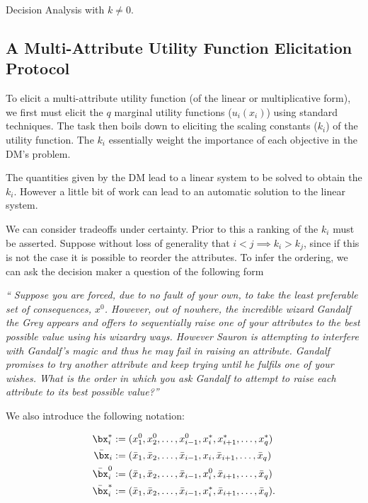 \begin{chapter}{Decision Analysis \label{Ch:decision}}
with $k \neq 0$.

\subsection{A Multi-Attribute Utility Function Elicitation Protocol}

To elicit a multi-attribute utility function (of the linear or multiplicative form), we first must elicit the $q$ marginal utility functions ($u_i(x_i)$) using standard techniques. The task then boils down to eliciting the scaling constants ($k_i$) of the utility function. The $k_i$ essentially weight the importance of each objective in the DM's problem.

The quantities given by the DM lead to a linear system to be solved to obtain the $k_i$. However a little bit of work can lead to an automatic solution to the linear system.

We can consider tradeoffs under certainty. Prior to this a ranking of the $k_i$ must be asserted. Suppose without loss of generality that $i<j \implies k_i > k_j$, since if this is not the case it is possible to reorder the attributes. To infer the ordering, we can ask the decision maker a question of the following form

\textit{``
Suppose you are forced, due to no fault of your own, to take the least preferable set of consequences, $x^0$. However, out of nowhere, the incredible wizard Gandalf the Grey appears and offers to sequentially raise one of your attributes to the best possible value using his wizardry ways. However Sauron is attempting to interfere with Gandalf's magic and thus he may fail in raising an attribute. Gandalf promises to try another attribute and keep trying until he fulfils one of your wishes. What is the order in which you ask Gandalf to attempt to raise each attribute to its best possible value?''
}

We also introduce the following notation:

\begin{align}
\bx_i ^* & := (x_1 ^0 , x_2 ^0, \ldots, x_{i-1} ^0, x_i ^*, x_{i+1} ^*, \ldots, x_q ^*) \\
\bar{\bx}_i & := (\bar{x}_1, \bar{x}_2,\ldots,\bar{x}_{i-1}, x_i,\bar{x}_{i+1}, \ldots,\bar{x}_{q}) \\
\bar{\bx}^0 _i & := (\bar{x}_1, \bar{x}_2,\ldots,\bar{x}_{i-1}, x^0 _i,\bar{x}_{i+1}, \ldots,\bar{x}_{q}) \\
\bar{\bx}^* _i & := (\bar{x}_1, \bar{x}_2,\ldots,\bar{x}_{i-1}, x^* _i,\bar{x}_{i+1}, \ldots,\bar{x}_{q}).
\end{align}


\end{chapter}
